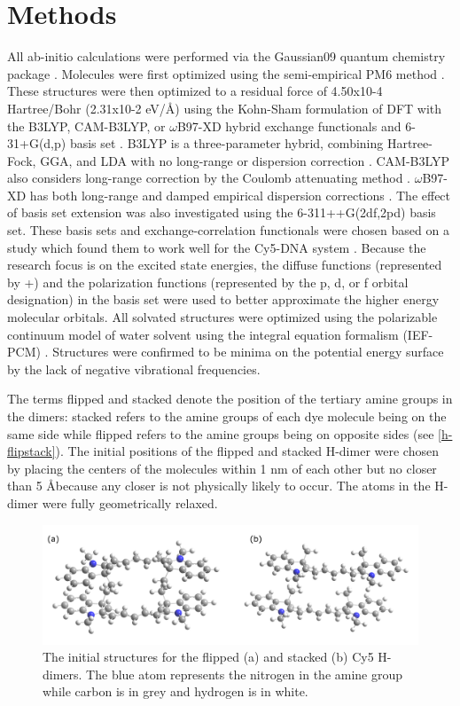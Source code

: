 \section{Methods}

All ab-initio calculations were performed via the Gaussian09 quantum chemistry package \cite{Frisch2009a}. Molecules were first optimized using the semi-empirical PM6 method \cite{Stewart2007}. These structures were then optimized to a residual force of 4.50x10-4 Hartree/Bohr (2.31x10-2 eV/\AA) using the Kohn-Sham formulation of DFT with the B3LYP, CAM-B3LYP, or $\omega$B97-XD hybrid exchange functionals and 6-31+G(d,p) basis set \cite{Becke1993c, Yanai2004, Chai2008a, Petersson1988a, Petersson1991a}. B3LYP is a three-parameter hybrid, combining Hartree-Fock, GGA, and LDA with no long-range or dispersion correction \cite{Becke1993c}. CAM-B3LYP also considers long-range correction by the Coulomb attenuating method \cite{Yanai2004}. $\omega$B97-XD has both long-range and damped empirical dispersion corrections \cite{Chai2008a}. The effect of basis set extension was also investigated using the 6-311++G(2df,2pd) basis set. These basis sets and exchange-correlation functionals were chosen based on a study which found them to work well for the Cy5-DNA system \cite{Maj2013}. Because the research focus is on the excited state energies, the diffuse functions (represented by +) and the polarization functions (represented by the p, d, or f orbital designation) in the basis set were used to better approximate the higher energy molecular orbitals. All solvated structures were optimized using the polarizable continuum model of water solvent using the integral equation formalism (IEF-PCM) \cite{Tomasi2005c}. Structures were confirmed to be minima on the potential energy surface by the lack of negative vibrational frequencies.

The terms flipped and stacked denote the position of the tertiary amine groups in the dimers: stacked refers to the amine groups of each dye molecule being on the same side while flipped refers to the amine groups being on opposite sides (see \autoref{h-flipstack}). The initial positions of the flipped and stacked H-dimer were chosen by placing the centers of the molecules within 1 nm of each other but no closer than 5 \AA because any closer is not physically likely to occur. The atoms in the H-dimer were fully geometrically relaxed. 
\begin{figure}[h!]
    \centering
    \includegraphics[width=0.8\linewidth]{figures/pub1/h-flipstack-ab.pdf}
    \caption{The initial structures for the flipped (a) and stacked (b) Cy5 H-dimers. The blue atom represents the nitrogen in the amine group while carbon is in grey and hydrogen is in white.}\label{h-flipstack}
\end{figure}

